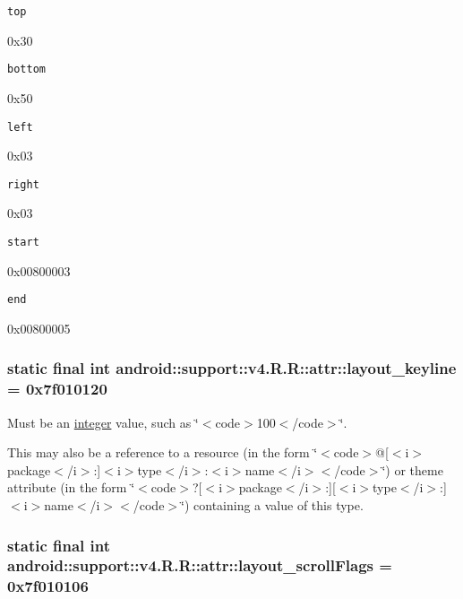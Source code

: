 {\tt top}

0x30

{\tt bottom}

0x50

{\tt left}

0x03

{\tt right}

0x03

{\tt start}

0x00800003

{\tt end}

0x00800005\hypertarget{classandroid_1_1support_1_1v4_1_1_r_1_1attr_e8b923df794a4d3214ef359ea296276c}{
\subsubsection[{layout\_\-keyline}]{\setlength{\rightskip}{0pt plus 5cm}static final int android::support::v4.R.R::attr::layout\_\-keyline = 0x7f010120}}
\label{classandroid_1_1support_1_1v4_1_1_r_1_1attr_e8b923df794a4d3214ef359ea296276c}


Must be an \hyperlink{classandroid_1_1support_1_1v4_1_1_r_1_1integer}{integer} value, such as \char`\"{}$<$code$>$100$<$/code$>$\char`\"{}. 

This may also be a reference to a resource (in the form \char`\"{}$<$code$>$@\mbox{[}$<$i$>$package$<$/i$>$:\mbox{]}$<$i$>$type$<$/i$>$:$<$i$>$name$<$/i$>$$<$/code$>$\char`\"{}) or theme attribute (in the form \char`\"{}$<$code$>$?\mbox{[}$<$i$>$package$<$/i$>$:\mbox{]}\mbox{[}$<$i$>$type$<$/i$>$:\mbox{]}$<$i$>$name$<$/i$>$$<$/code$>$\char`\"{}) containing a value of this type. \hypertarget{classandroid_1_1support_1_1v4_1_1_r_1_1attr_372a6fac3cf685458fc5b5390db5d2c2}{
\subsubsection[{layout\_\-scrollFlags}]{\setlength{\rightskip}{0pt plus 5cm}static final int android::support::v4.R.R::attr::layout\_\-scrollFlags = 0x7f010106}}
\label{classandroid_1_1support_1_1v4_1_1_r_1_1attr_372a6fac3cf685458fc5b5390db5d2c2}


